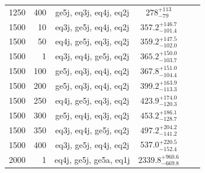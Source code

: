 \begin{table}
\begin{tabular}{rrcccc}
     1250 & 400 & ge5j, eq3j, eq4j, eq2j & $278_{-79}^{+113}$         \\ %
     1500 &  10 & eq3j, ge5j, eq4j, eq2j & $357.2_{-101.4}^{+146.7}$  \\ %
     1500 &  50 & eq4j, ge5j, eq3j, eq2j & $359.2_{-102.0}^{+147.5}$  \\ %
     1500 &   1 & eq3j, eq4j, ge5j, eq2j & $365.2_{-103.7}^{+150.0}$  \\ %
     1500 & 100 & ge5j, eq3j, eq4j, eq2j & $367.8_{-104.4}^{+151.0}$  \\ %
     1500 & 200 & ge5j, eq3j, eq4j, eq2j & $399.2_{-113.3}^{+163.9}$  \\ %
     1500 & 250 & eq4j, ge5j, eq3j, eq2j & $423.9_{-120.3}^{+174.0}$  \\ %
     1500 & 300 & ge5j, eq4j, eq3j, eq2j & $453.2_{-128.7}^{+186.1}$  \\ %
     1500 & 350 & eq3j, eq4j, ge5j, eq2j & $497.2_{-141.2}^{+204.2}$  \\ %
     1500 & 400 & eq3j, ge5j, eq4j, eq2j & $537.0_{-152.4}^{+220.5}$  \\ %
     2000 &   1 & eq4j, ge5j, ge5a, eq1j & $2339.8_{-669.8}^{+960.6}$ \\ %


\end{tabular}
\end{table}
